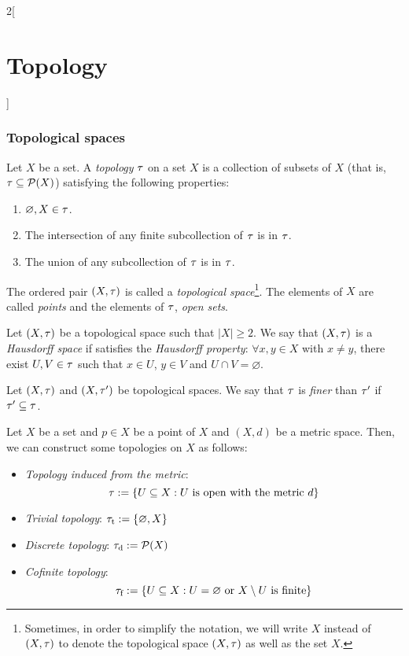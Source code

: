 \documentclass[../../../main.tex]{subfiles}
\begin{document}
\begin{multicols}{2}[\section{Topology}]
  \subsubsection{Topological spaces}
  \begin{definition}
    Let $X$ be a set. A \textit{topology} $\tau$ on a set $X$ is a collection of subsets of $X$ (that is, $\tau\subseteq\mathcal{P}(X)$) satisfying the following properties:
    \begin{enumerate}
      \item $\varnothing, X\in\tau$.
      \item The intersection of any finite subcollection of $\tau$ is in $\tau$.
      \item The union of any subcollection of $\tau$ is in $\tau$.
    \end{enumerate}
    The ordered pair $(X,\tau)$ is called a \textit{topological space}\footnote{Sometimes, in order to simplify the notation, we will write $X$ instead of $(X,\tau)$ to denote the topological space $(X,\tau)$ as well as the set $X$.}. The elements of $X$ are called \textit{points} and the elements of $\tau$, \textit{open sets}.
  \end{definition}
  \begin{definition}
    Let $(X,\tau)$ be a topological space such that $|X|\geq 2$. We say that $(X,\tau)$ is a \textit{Hausdorff space} if satisfies the \textit{Hausdorff property}: $\forall x,y\in X$ with $x\ne y$, there exist $U,V\in\tau$ such that $x\in U$, $y\in V$ and $U\cap V=\varnothing$.
  \end{definition}
  \begin{definition}
    Let $(X,\tau)$ and $(X,\tau')$ be topological spaces. We say that $\tau$ is \textit{finer} than $\tau'$ if $\tau'\subseteq\tau$.
  \end{definition}
  \begin{prop}
    Let $X$ be a set and $p\in X$ be a point of $X$ and $(X,d)$ be a metric space. Then, we can construct some topologies on $X$ as follows:
    \begin{itemize}
      \item \textit{Topology induced from the metric}: $$\tau:=\{U\subseteq X:U\text{ is open with the metric }d\}$$
      \item \textit{Trivial topology}: $\tau_\text{t}:=\{\varnothing,X\}$
      \item \textit{Discrete topology}: $\tau_\text{d}:=\mathcal{P}(X)$
      \item \textit{Cofinite topology}: $$\tau_\text{f}:=\{U\subseteq X:U=\varnothing\text{ or }X\setminus U\text{ is finite}\}$$

\end{itemize}
\end{prop}
\end{multicols}
\end{document}
